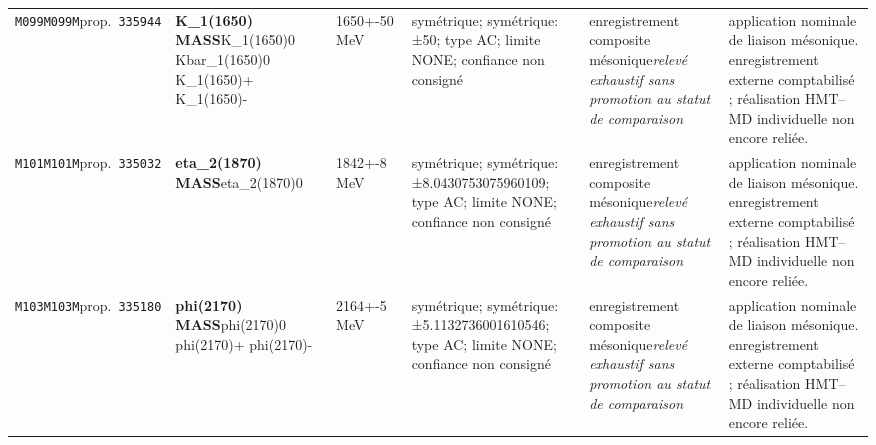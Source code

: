 \begin{landscape}
\begin{longtable}{L{1.85cm}L{4.45cm}L{2.35cm}L{4.05cm}L{3.35cm}L{7.15cm}}
\texttt{M099}\newline \texttt{M099M}\newline prop.\ \texttt{335944} & \textbf{K\_\allowbreak{}1(1650) MASS}\newline K\_\allowbreak{}1(1650)0 \textbar{}\allowbreak{} Kbar\_\allowbreak{}1(1650)0 \textbar{}\allowbreak{} K\_\allowbreak{}1(1650)+ \textbar{}\allowbreak{} K\_\allowbreak{}1(1650)- & 1650+-50\,MeV & symétrique; symétrique: ±50; type AC; limite NONE; confiance non consigné & enregistrement composite mésonique\newline \emph{relevé exhaustif sans promotion au statut de comparaison} & application nominale de liaison mésonique. enregistrement externe comptabilisé ; réalisation HMT--MD individuelle non encore reliée. \\
\texttt{M101}\newline \texttt{M101M}\newline prop.\ \texttt{335032} & \textbf{eta\_\allowbreak{}2(1870) MASS}\newline eta\_\allowbreak{}2(1870)0 & 1842+-8\,MeV & symétrique; symétrique: ±8.0430753075960109; type AC; limite NONE; confiance non consigné & enregistrement composite mésonique\newline \emph{relevé exhaustif sans promotion au statut de comparaison} & application nominale de liaison mésonique. enregistrement externe comptabilisé ; réalisation HMT--MD individuelle non encore reliée. \\
\texttt{M103}\newline \texttt{M103M}\newline prop.\ \texttt{335180} & \textbf{phi(2170) MASS}\newline phi(2170)0 \textbar{}\allowbreak{} phi(2170)+ \textbar{}\allowbreak{} phi(2170)- & 2164+-5\,MeV & symétrique; symétrique: ±5.1132736001610546; type AC; limite NONE; confiance non consigné & enregistrement composite mésonique\newline \emph{relevé exhaustif sans promotion au statut de comparaison} & application nominale de liaison mésonique. enregistrement externe comptabilisé ; réalisation HMT--MD individuelle non encore reliée. \\

\end{longtable}
\end{landscape}

